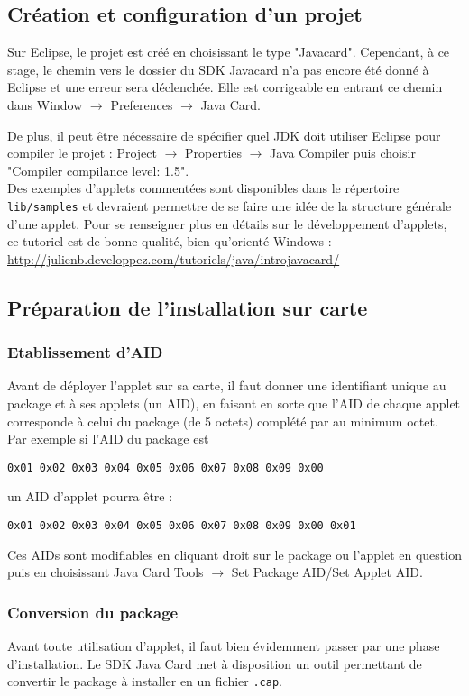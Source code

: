 \documentclass[a4paper,11pt,french]{article}
\begin{document}
\subsection{Création et configuration d'un projet}
Sur Eclipse, le projet est créé en choisissant le type "Javacard". Cependant,
à ce stage, le chemin vers le dossier du SDK Javacard n'a pas encore été donné
à Eclipse et une erreur sera déclenchée. Elle est corrigeable en entrant ce chemin
dans Window $\rightarrow$ Preferences $\rightarrow$ Java Card.

De plus, il peut être nécessaire de spécifier quel JDK doit utiliser Eclipse
pour compiler le projet : Project $\rightarrow$ Properties $\rightarrow$ Java 
Compiler puis choisir "Compiler compilance level: 1.5".\\

Des exemples d'applets commentées sont disponibles dans le répertoire \texttt{lib/samples}
et devraient permettre de se faire une idée de la structure générale d'une 
applet. Pour se renseigner plus en détails sur le développement d'applets, 
ce tutoriel est de bonne qualité, bien qu'orienté Windows : 
\url{http://julienb.developpez.com/tutoriels/java/introjavacard/}

\subsection{Préparation de l'installation sur carte}
\subsubsection{Etablissement d'AID}
Avant de déployer l'applet sur sa carte, il faut donner une identifiant unique
au package et à ses applets (un AID), en faisant en sorte que l'AID de chaque applet
corresponde à celui du package (de 5 octets) complété par au minimum octet. 
Par exemple si l'AID du package est 
\begin{verbatim}
0x01 0x02 0x03 0x04 0x05 0x06 0x07 0x08 0x09 0x00
\end{verbatim}
un AID d'applet pourra être :
\begin{verbatim}
0x01 0x02 0x03 0x04 0x05 0x06 0x07 0x08 0x09 0x00 0x01
\end{verbatim}
Ces AIDs sont modifiables en cliquant droit sur le package ou l'applet en question
puis en choisissant Java Card Tools $\rightarrow$ Set Package AID/Set Applet AID. \\

\subsubsection{Conversion du package}
Avant toute utilisation d'applet, il faut bien évidemment passer par une phase
d'installation. Le SDK Java Card met à disposition un outil permettant de convertir
le package à installer en un fichier \texttt{.cap}.
\end{document}
